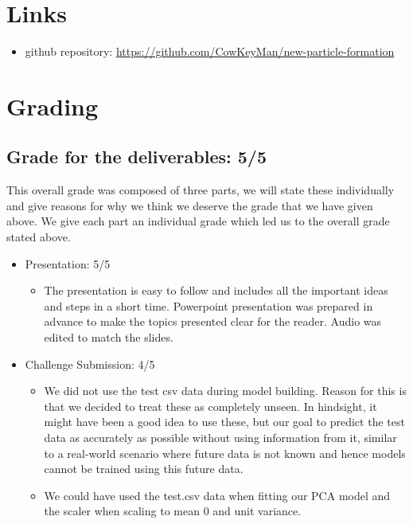 \chapter{Links}

\begin{itemize}
	\item github repository: \url{https://github.com/CowKeyMan/new-particle-formation}
\end{itemize}

\newpage

\chapter{Grading}

\section{Grade for the deliverables: 5/5}

This overall grade was composed of three parts, we will state these individually and give reasons for why we think we deserve the grade that we have given above. We give each part an individual grade which led us to the overall grade stated above.

\begin{itemize}
\item Presentation: 5/5
  \begin{itemize}
    \item The presentation is easy to follow and includes all the important ideas and steps in a short time. Powerpoint presentation was prepared in advance to make the topics presented clear for the reader. Audio was edited to match the slides.
  \end{itemize}
\item Challenge Submission: 4/5
  \begin{itemize}
    \item We did not use the test csv data during model building. Reason for this is that we decided to treat these as completely unseen. In hindsight, it might have been a good idea to use these, but our goal to predict the test data as accurately as possible without using information from it, similar to a real-world scenario where future data is not known and hence models cannot be trained using this future data.
    \item We could have used the test.csv data when fitting our PCA model and the scaler when scaling to mean 0 and unit variance.
  \end{itemize}
\end{itemize}

